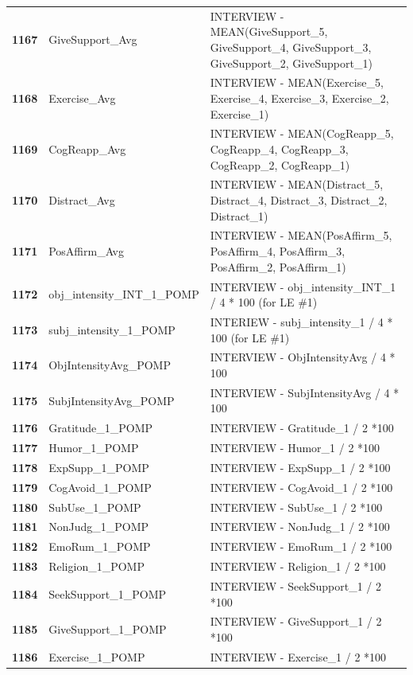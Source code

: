 \documentclass[
  letterpaper,
  DIV=11,
  numbers=noendperiod]{scrartcl}
\begin{document}
\begin{longtable}[t]{>{}cll}
\textbf{1167} & GiveSupport\_Avg & INTERVIEW - MEAN(GiveSupport\_5, GiveSupport\_4, GiveSupport\_3, GiveSupport\_2, GiveSupport\_1)\\
\textbf{1168} & Exercise\_Avg & INTERVIEW - MEAN(Exercise\_5, Exercise\_4, Exercise\_3, Exercise\_2, Exercise\_1)\\
\textbf{1169} & CogReapp\_Avg & INTERVIEW - MEAN(CogReapp\_5, CogReapp\_4, CogReapp\_3, CogReapp\_2, CogReapp\_1)\\
\textbf{1170} & Distract\_Avg & INTERVIEW - MEAN(Distract\_5, Distract\_4, Distract\_3, Distract\_2, Distract\_1)\\
\addlinespace
\textbf{1171} & PosAffirm\_Avg & INTERVIEW - MEAN(PosAffirm\_5, PosAffirm\_4, PosAffirm\_3, PosAffirm\_2, PosAffirm\_1)\\
\textbf{1172} & obj\_intensity\_INT\_1\_POMP & INTERVIEW - obj\_intensity\_INT\_1 / 4 * 100 (for LE \#1)\\
\textbf{1173} & subj\_intensity\_1\_POMP & INTERIEW - subj\_intensity\_1 / 4 * 100 (for LE \#1)\\
\textbf{1174} & ObjIntensityAvg\_POMP & INTERVIEW - ObjIntensityAvg / 4 * 100\\
\textbf{1175} & SubjIntensityAvg\_POMP & INTERVIEW - SubjIntensityAvg / 4 * 100\\
\addlinespace
\textbf{1176} & Gratitude\_1\_POMP & INTERVIEW - Gratitude\_1 / 2 *100\\
\textbf{1177} & Humor\_1\_POMP & INTERVIEW - Humor\_1 / 2 *100\\
\textbf{1178} & ExpSupp\_1\_POMP & INTERVIEW - ExpSupp\_1 / 2 *100\\
\textbf{1179} & CogAvoid\_1\_POMP & INTERVIEW - CogAvoid\_1 / 2 *100\\
\textbf{1180} & SubUse\_1\_POMP & INTERVIEW - SubUse\_1 / 2 *100\\
\addlinespace
\textbf{1181} & NonJudg\_1\_POMP & INTERVIEW - NonJudg\_1 / 2 *100\\
\textbf{1182} & EmoRum\_1\_POMP & INTERVIEW - EmoRum\_1 / 2 *100\\
\textbf{1183} & Religion\_1\_POMP & INTERVIEW - Religion\_1 / 2 *100\\
\textbf{1184} & SeekSupport\_1\_POMP & INTERVIEW - SeekSupport\_1 / 2 *100\\
\textbf{1185} & GiveSupport\_1\_POMP & INTERVIEW - GiveSupport\_1 / 2 *100\\
\addlinespace
\textbf{1186} & Exercise\_1\_POMP & INTERVIEW - Exercise\_1 / 2 *100\\

\end{longtable}
\end{document}
